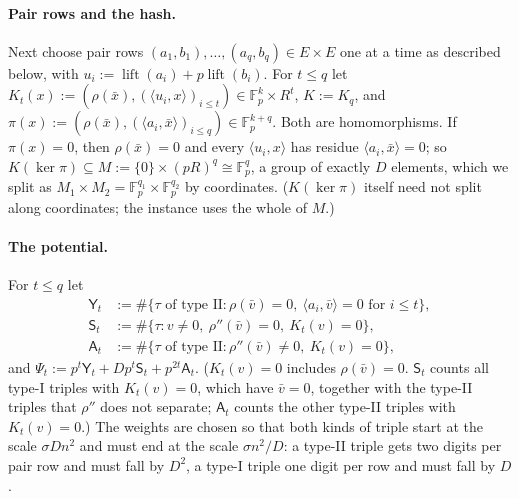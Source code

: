\documentclass[11pt]{article}
\theoremstyle{definition}
\theoremstyle{remark}
\newcommand{\Fp}{\mathbb{F}_p}
\DeclareMathOperator{\lift}{lift}
\begin{document}
\paragraph{Pair rows and the hash.} Next choose pair rows $(a_1,b_1),\dots,(a_q,b_q)\in E\times E$ one at a time as described below, with $u_i:=\lift(a_i)+p\lift(b_i)$. For $t\le q$ let $K_t(x):=(\rho(\bar x),(\langle u_i,x\rangle)_{i\le t})\in\Fp^k\times R^t$, $K:=K_q$, and $\pi(x):=(\rho(\bar x),(\langle a_i,\bar x\rangle)_{i\le q})\in\Fp^{k+q}$. Both are homomorphisms. If $\pi(x)=0$, then $\rho(\bar x)=0$ and every $\langle u_i,x\rangle$ has residue $\langle a_i,\bar x\rangle=0$; so $K(\ker\pi)\subseteq M:=\{0\}\times(pR)^q\cong\Fp^q$, a group of exactly $D$ elements, which we split as $M_1\times M_2=\Fp^{q_1}\times\Fp^{q_2}$ by coordinates. ($K(\ker\pi)$ itself need not split along coordinates; the instance uses the whole of $M$.)

\paragraph{The potential.} For $t\le q$ let
\begin{align*}
\mathsf Y_t&:=\#\{\tau\text{ of type II}:\rho(\bar v)=0,\ \langle a_i,\bar v\rangle=0\text{ for }i\le t\},\\
\mathsf S_t&:=\#\{\tau:v\ne0,\ \rho''(\bar v)=0,\ K_t(v)=0\},\\
\mathsf A_t&:=\#\{\tau\text{ of type II}:\rho''(\bar v)\ne0,\ K_t(v)=0\},
\end{align*}
and $\Psi_t:=p^t\mathsf Y_t+Dp^t\mathsf S_t+p^{2t}\mathsf A_t$. ($K_t(v)=0$ includes $\rho(\bar v)=0$. $\mathsf S_t$ counts all type-I triples with $K_t(v)=0$, which have $\bar v=0$, together with the type-II triples that $\rho''$ does not separate; $\mathsf A_t$ counts the other type-II triples with $K_t(v)=0$.) The weights are chosen so that both kinds of triple start at the scale $\sigma Dn^2$ and must end at the scale $\sigma n^2/D$: a type-II triple gets two digits per pair row and must fall by $D^2$, a type-I triple one digit per row and must fall by $D$.
\end{document}
